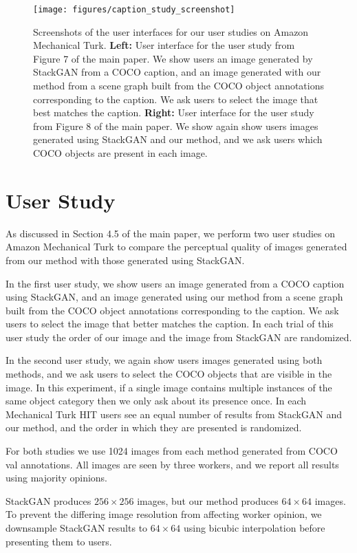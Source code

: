 \documentclass[10pt,twocolumn,letterpaper]{article}
\begin{document}
 
\begin{figure*}
  \centering
  \texttt{[image: figures/caption\_study\_screenshot]}
  \caption{
    Screenshots of the user interfaces for our user studies on Amazon Mechanical Turk.
    \textbf{Left:} User interface for the user study from Figure 7 of the main paper.
    We show users an image generated by StackGAN from a COCO caption, and an image 
    generated with our method from a scene graph built from the COCO object annotations
    corresponding to the caption. We ask users to select the image that best matches
    the caption.
    \textbf{Right:} User interface for the user study from Figure 8 of the main paper.
    We show again show users images generated using StackGAN and our method, and we
    ask users which COCO objects are present in each image.
  }
  \label{fig:user-study-ui}
\end{figure*}

\section{User Study}
As discussed in Section 4.5 of the main paper, we perform two user studies on Amazon
Mechanical Turk to compare the perceptual quality of images generated from our method
with those generated using StackGAN.

In the first user study, we show users an image generated from a COCO caption using
StackGAN, and an image generated using our method from a scene graph built from the
COCO object annotations corresponding to the caption. We ask users to select the image that
better matches the caption. In each trial of this user study the order of our image and the
image from StackGAN are randomized.

In the second user study, we again show users images generated using both methods,
and we ask users to select the COCO objects that are visible in the image.
In this experiment, if a single image contains multiple instances of the same object
category then we only ask about its presence once. In each Mechanical Turk HIT users
see an equal number of results from StackGAN and our method, and the order in which
they are presented is randomized.

For both studies we use 1024 images from each method generated from COCO val annotations.
All images are seen by three workers, and we report all results using majority opinions.

StackGAN produces $256\times256$ images, but our method produces $64\times64$ images.
To prevent the differing image resolution from affecting worker opinion, we downsample
StackGAN results to $64\times64$ using bicubic interpolation before presenting them to
users.
 \clearpage
\end{document}
